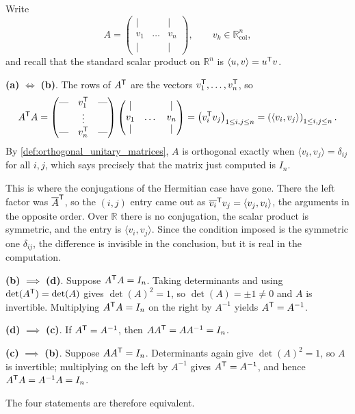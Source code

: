 \begin{exercisesolution}
\label{sol:char_orthogonal_matrices_proof}
  Write
  \[
      A = \begin{pmatrix} | & & | \\ v_1 & \dots & v_n \\ | & & | \end{pmatrix}, \qquad v_k \in \mathbb{R}^n_{\text{col}},
  \]
  and recall that the standard scalar product on $\mathbb{R}^n$ is $\langle u, v \rangle = u^{\mathsf{T}} v$.

  \textbf{(a)} $\iff$ \textbf{(b)}. The rows of $A^{\mathsf{T}}$ are the vectors $v_1^{\mathsf{T}}, \dots, v_n^{\mathsf{T}}$, so
  \[
      A^{\mathsf{T}} A = \begin{pmatrix} \text{---} & v_1^{\mathsf{T}} & \text{---} \\ & \vdots & \\ \text{---} & v_n^{\mathsf{T}} & \text{---} \end{pmatrix} \begin{pmatrix} | & & | \\ v_1 & \dots & v_n \\ | & & | \end{pmatrix} = \left( v_i^{\mathsf{T}} v_j \right)_{1 \le i, j \le n} = \left( \langle v_i, v_j \rangle \right)_{1 \le i, j \le n}.
  \]
  By \cref{def:orthogonal_unitary_matrices}, $A$ is orthogonal exactly when $\langle v_i, v_j \rangle = \delta_{ij}$ for all $i, j$, which says precisely that the matrix just computed is $I_n$.

  This is where the conjugations of the Hermitian case have gone. There the left factor was $\overline{A}^{\mathsf{T}}$, so the $(i,j)$ entry came out as $\overline{v_i}^{\mathsf{T}} v_j = \langle v_j, v_i \rangle$, the arguments in the opposite order. Over $\mathbb{R}$ there is no conjugation, the scalar product is symmetric, and the entry is $\langle v_i, v_j \rangle$. Since the condition imposed is the symmetric one $\delta_{ij}$, the difference is invisible in the conclusion, but it is real in the computation.

  \textbf{(b)} $\implies$ \textbf{(d)}. Suppose $A^{\mathsf{T}} A = I_n$. Taking determinants and using $\det(A^{\mathsf{T}}) = \det(A)$ gives $\det(A)^2 = 1$, so $\det(A) = \pm 1 \ne 0$ and $A$ is invertible. Multiplying $A^{\mathsf{T}} A = I_n$ on the right by $A^{-1}$ yields $A^{\mathsf{T}} = A^{-1}$.

  \textbf{(d)} $\implies$ \textbf{(c)}. If $A^{\mathsf{T}} = A^{-1}$, then $A A^{\mathsf{T}} = A A^{-1} = I_n$.

  \textbf{(c)} $\implies$ \textbf{(b)}. Suppose $A A^{\mathsf{T}} = I_n$. Determinants again give $\det(A)^2 = 1$, so $A$ is invertible; multiplying on the left by $A^{-1}$ gives $A^{\mathsf{T}} = A^{-1}$, and hence $A^{\mathsf{T}} A = A^{-1} A = I_n$.

  The four statements are therefore equivalent.
\end{exercisesolution}


